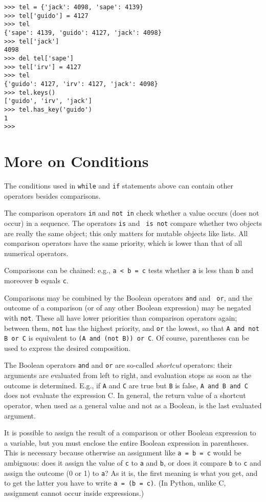 \bcode\begin{verbatim}
>>> tel = {'jack': 4098, 'sape': 4139}
>>> tel['guido'] = 4127
>>> tel
{'sape': 4139, 'guido': 4127, 'jack': 4098}
>>> tel['jack']
4098
>>> del tel['sape']
>>> tel['irv'] = 4127
>>> tel
{'guido': 4127, 'irv': 4127, 'jack': 4098}
>>> tel.keys()
['guido', 'irv', 'jack']
>>> tel.has_key('guido')
1
>>> 
\end{verbatim}\ecode

\section{More on Conditions}

The conditions used in {\tt while} and {\tt if} statements above can
contain other operators besides comparisons.

The comparison operators {\tt in} and {\tt not in} check whether a value
occurs (does not occur) in a sequence.  The operators {\tt is} and {\tt
is not} compare whether two objects are really the same object; this
only matters for mutable objects like lists.  All comparison operators
have the same priority, which is lower than that of all numerical
operators.

Comparisons can be chained: e.g., {\tt a < b = c} tests whether {\tt a}
is less than {\tt b} and moreover {\tt b} equals {\tt c}.

Comparisons may be combined by the Boolean operators {\tt and} and {\tt
or}, and the outcome of a comparison (or of any other Boolean
expression) may be negated with {\tt not}.  These all have lower
priorities than comparison operators again; between them, {\tt not} has
the highest priority, and {\tt or} the lowest, so that
{\tt A and not B or C} is equivalent to {\tt (A and (not B)) or C}.  Of
course, parentheses can be used to express the desired composition.

The Boolean operators {\tt and} and {\tt or} are so-called {\em
shortcut} operators: their arguments are evaluated from left to right,
and evaluation stops as soon as the outcome is determined.  E.g., if
{\tt A} and {\tt C} are true but {\tt B} is false, {\tt A and B and C}
does not evaluate the expression C.  In general, the return value of a
shortcut operator, when used as a general value and not as a Boolean, is
the last evaluated argument.

It is possible to assign the result of a comparison or other Boolean
expression to a variable, but you must enclose the entire Boolean
expression in parentheses.  This is necessary because otherwise an
assignment like \verb/a = b = c/ would be ambiguous: does it assign the
value of {\tt c} to {\tt a} and {\tt b}, or does it compare {\tt b} to
{\tt c} and assign the outcome (0 or 1) to {\tt a}?  As it is, the first
meaning is what you get, and to get the latter you have to write
\verb/a = (b = c)/.  (In Python, unlike C, assignment cannot occur
inside expressions.)

